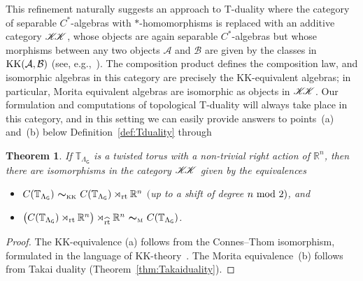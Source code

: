 \documentclass[10pt,a4paper]{amsart}
\numberwithin{equation}{section}
\newcommand{\mbf}[1]{{\boldsymbol {#1} }}
\newcommand{\CCK}{\mathscr{K}}
\newcommand{\sfG}{\mathsf{G}}
\newcommand{\rt}{{\rm rt}}
\newcommand{\real}{{\mathbb R}} %
\newcommand{\torus}{{\mathbb T}} %
\def\alg{{\mathcal A}}
\def\balg{{\mathcal B}}
\newtheorem{Theorem}{Theorem}[section]
\begin{document}
This refinement naturally
suggests an approach to T-duality where the category of separable
$C^*$-algebras with $*$-homomorphisms is replaced with an additive
category ${\CCK\hspace{-1mm}\CCK}$, whose objects are again separable $C^*$-algebras
but whose morphisms between any two objects $\alg$ and $\balg$ are
given by the classes in ${\rm KK}(\alg,\balg)$ (see,
e.g.,~\cite{Brodzki2007}). The composition product defines the
composition law, and isomorphic algebras
in this category are precisely the KK-equivalent
algebras; in particular, Morita equivalent algebras are isomorphic
as objects in ${\CCK\hspace{-1mm}\CCK}$. Our formulation and computations of topological
T-duality will always take place in this category, and in this
setting we can easily provide answers to points~(a) and~(b) below Definition~\ref{def:Tduality}
through
\begin{Theorem}\label{thm:equivalences}
If $\torus_{\Lambda_\sfG}$ is a twisted torus with a
non-trivial right action
of $\real^n$, then there are
isomorphisms in the category ${\CCK\hspace{-1mm}\CCK}$ given by the equivalences
\begin{itemize}\itemsep=0pt
\item[{\rm (a)}]  $C(\torus_{\Lambda_\sfG}) \
 \mbf\sim_{\text{\tiny{KK}}} \
 C(\torus_{\Lambda_\sfG})\rtimes_\rt\real^n  $ $($up to a shift of degree
 $n \ {\rm mod}~2)$, and
\item[{\rm (b)}]  $\big(C(\torus_{\Lambda_\sfG})\rtimes_\rt
 \real^n\big)\rtimes_{\widehat\rt} \real^n \ \mbf\sim_{\text{\tiny
 M}} \ C(\torus_{\Lambda_\sfG})$.
\end{itemize}
\end{Theorem}
\begin{proof}
The KK-equivalence (a) follows from the Connes--Thom isomorphism,
formulated in the language of KK-theory~\cite{Fack1981}. The Morita
equivalence~(b) follows from Takai duality
(Theorem~\ref{thm:Takaiduality}).
\end{proof}
\end{document}
